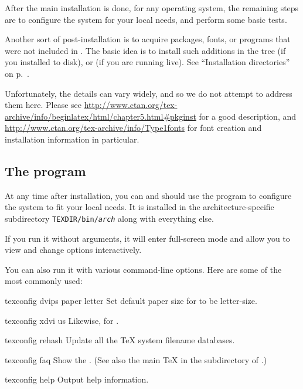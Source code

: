 \documentclass{article}
\begin{document}
After the main installation is done, for any operating system, the
remaining steps are to configure the system for your local needs, and
perform some basic tests.

Another sort of post-installation is to acquire packages, fonts, or
programs that were not included in \TeXLive{}.  The basic idea is to
install such additions in the  tree (if you
installed to disk), or  (if you are running live).
See ``Installation directories'' on p.~\pageref{text:instdir}.

Unfortunately, the details can vary widely, and so we do not attempt to
address them here.  Please see
\url{http://www.ctan.org/tex-archive/info/beginlatex/html/chapter5.html#pkginst}
for a good description, and 
\url{http://www.ctan.org/tex-archive/info/Type1fonts} for font creation
and installation information in particular.


\subsection{The \protect{} program}
\label{sec:texconfig}

At any time after installation, you can and should use the program
 to configure the system to fit your local needs.  It
is installed in the architecture-specific subdirectory
\texttt{TEXDIR/bin/\emph{arch}} along with everything else.

If you run it without arguments, it will enter full-screen mode and
allow you to view and change options interactively.

You can also run it with various command-line options.  Here are some of
the most commonly used:

\begin{ttdescription}

\item [texconfig dvips paper letter] Set default paper size for
 to be letter-size.

\item [texconfig xdvi us] Likewise, for .

\item [texconfig rehash] Update all the \TeX{} system filename databases.

\item [texconfig faq] Show the \teTeX{} .
(See also the main \TeX{}  in the  subdirectory
of \TeXLive.)

\item [texconfig help] Output help information.

\end{ttdescription}
\end{document}
